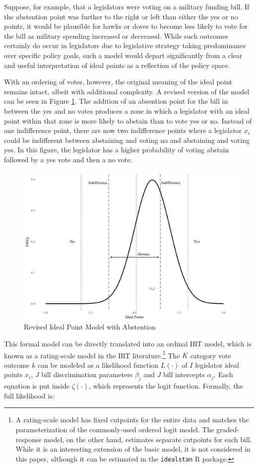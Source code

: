  	Suppose, for example, that a legislators were voting on a military funding bill. If the abstention point was further to the right or left than either the yes or no points, it would be plausible for hawks or doves to become less likely to vote for the bill as military spending increased or decreased. While such outcomes certainly do occur in legislators due to legislative strategy taking predominance over specific policy goals, such a model would depart significantly from a clear and useful interpretation of ideal points as a reflection of the policy space.
 	
 	With an ordering of votes, however, the original meaning of the ideal point remains intact, albeit with additional complexity. A revised version of the model can be seen in Figure \ref{abs_pts}. The addition of an absention point for the bill in between the yes and no votes produces a zone in which a legislator with an ideal point within that zone is more likely to abstain than to vote yes or no. Instead of one indifference point, there are now two indifference points where a legislator $x_i$ could be indifferent between abstaining and voting no and abstaining and voting yes. In this figure, the legislator has a higher probability of voting abstain followed by a yes vote and then a no vote.
 	 	\begin{figure}[h!]
 		\caption{Revised Ideal Point Model with Abstention}\label{abs_pts}
 		\includegraphics[width=0.9\linewidth]{ideal_pt_with_abstain}
 	\end{figure}
	
This formal model can be directly translated into an ordinal IRT model, which is known as a rating-scale model in the IRT literature.\footnote{A rating-scale model has fixed cutpoints for the entire data and matches the parameterization of the commonly-used ordered logit model. The graded-response model, on the other hand, estimates separate cutpoints for each bill. While it is an interesting extension of the basic model, it is not considered in this paper, although it can be estimated in the \texttt{idealstan} R package.} The $K$ category vote outcome $k$ can be modeled as a likelihood function $L(\cdot)$ of $I$ legislator ideal points $x_i$, $J$ bill discrimination parameters $\beta_j$ and $J$ bill intercepts $\alpha_j$. Each equation is put inside $\zeta(\cdot)$, which represents the logit function. Formally, the full likelihood is:
	
